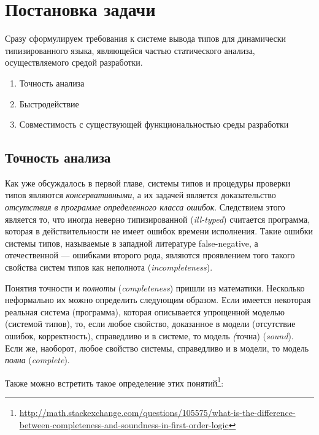 \chapter{Постановка задачи}

Сразу сформулируем требования к системе вывода типов для динамически
типизированного языка, являющейся частью статического анализа, осуществляемого
средой разработки.

\begin{enumerate}
    \item{Точность анализа}
    \item{Быстродействие}
    \item{Совместимость с существующей функциональностью среды разработки}
\end{enumerate}

\section{Точность анализа}

Как уже обсуждалось в первой главе, системы типов и процедуры проверки типов
являются \emph{консервативными}, а их задачей является доказательство
\emph{отсутствия в программе определенного класса ошибок}.  Следствием этого
является то, что иногда неверно типизированной (\emph{ill-typed}) считается
программа, которая в действительности не имеет ошибок времени исполнения. Такие
ошибки системы типов, называемые в западной литературе false-negative, а
отечественной --- ошибками второго рода, являются проявлением того такого
свойства систем типов как неполнота (\emph{incompleteness}). 

Понятия точности и \emph{полноты} (\emph{completeness}) пришли из математики. Несколько
неформально их можно определить следующим образом. Если имеется некоторая
реальная система (программа), которая описывается упрощенной моделью (системой
типов), то, если любое свойство, доказанное в модели (отсутствие ошибок,
корректность), справедливо и в системе, то модель \emph(точна) (\emph{sound}).
Если же, наоборот, любое свойство системы, справедливо и в модели, то модель
\emph{полна} (\emph{complete}).

Также можно встретить такое определение этих
понятий\footnote{\url{http://math.stackexchange.com/questions/105575/what-is-the-difference-between-completeness-and-soundness-in-first-order-logic}}:


